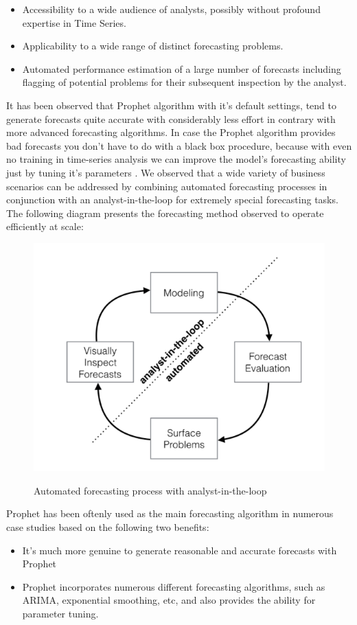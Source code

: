 \begin{itemize}
    \item Accessibility to a wide audience of analysts, possibly without profound expertise in Time Series.
    \item Applicability to a wide range of distinct forecasting problems.
    \item Automated performance estimation of a large number of forecasts including flagging of potential problems for their subsequent inspection by the analyst.
\end{itemize}
\par It has been observed that Prophet algorithm with it's default settings, tend to generate forecasts quite accurate with considerably less effort in contrary with more advanced forecasting algorithms. In case the Prophet algorithm provides bad forecasts you don't have to do with a black box procedure, because with even no training in time-series analysis we can improve the model's forecasting ability just by tuning it's parameters \cite{park2019144}. We observed that a wide variety of business scenarios can be addressed by combining automated forecasting processes in conjunction with an analyst-in-the-loop for extremely special forecasting tasks. The following diagram \cite{taylor2018forecasting} presents the forecasting method observed to operate efficiently at scale:
\begin{figure}[htbp]
\centering
\includegraphics[width=0.8\linewidth]{project/prophet.PNG}
\label{fig:felix}
\caption{Automated forecasting process with analyst-in-the-loop}
\end{figure}
Prophet has been oftenly used as the main forecasting algorithm in numerous case studies based on the following two benefits:
\begin{itemize}
    \item It's much more genuine to generate reasonable and accurate forecasts with Prophet
    \item Prophet incorporates numerous different forecasting algorithms, such as ARIMA, exponential smoothing, etc, and also provides the ability for parameter tuning.
\end{itemize}
